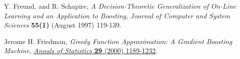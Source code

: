 \documentclass{JINST}
\theoremstyle{definition}
\theoremstyle{remark}
\begin{document}
\begin{thebibliography}{9}
{Y. Freund, and R. Schapire},
\emph{A Decision-Theoretic Generalization of On-Line Learning and an Application to Boosting}, 
{\emph{Journal of Computer and System Sciences} {\bf 55(1)} (August 1997) 119-139}.

{Jerome H. Friedman},
\emph{Greedy Function Approximation: A Gradient Boosting Machine},
\href{http://statweb.stanford.edu/~jhf/ftp/trebst.pdf}
{\emph{Annals of Statistics} {\bf 29} (2000) 1189-1232}.







\end{thebibliography}

\appendix


\end{document}
